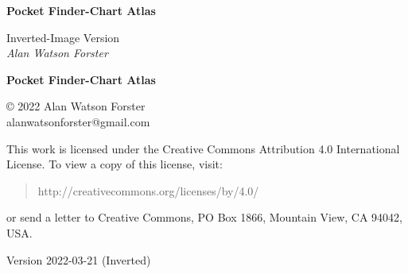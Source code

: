 
\pagestyle{empty}


\begin{center}
\vspace*{1cm}

\begingroup
\Huge\bfseries Pocket Finder-Chart Atlas\endgroup

\vspace{0.5cm}

\vspace{0.5cm}

\begingroup
\large Inverted-Image Version\\[\bigskipamount]
\large{\itshape Alan Watson Forster}
\endgroup

\end{center}


\cleardoublepage


\setcounter{page}{1}

\null\vfill

\begin{center}

\begingroup
\huge\bfseries Pocket Finder-Chart Atlas
\endgroup

\end{center}

\vfill

\clearpage


\null\vfill

\begin{raggedright}
\small

© 2022 Alan Watson Forster\\
alanwatsonforster@gmail.com

\medskip

This work is licensed under the Creative Commons Attribution 4.0 International License. To view a copy of this license, visit:
\begin{quote}
 http://creativecommons.org/licenses/by/4.0/ 
\end{quote}
or send a letter to Creative Commons, PO Box 1866, Mountain View, CA 94042, USA.

\medskip

Version 2022-03-21 (Inverted)

\end{raggedright}

\cleardoublepage


\pagestyle{plain}

\tableofcontents
